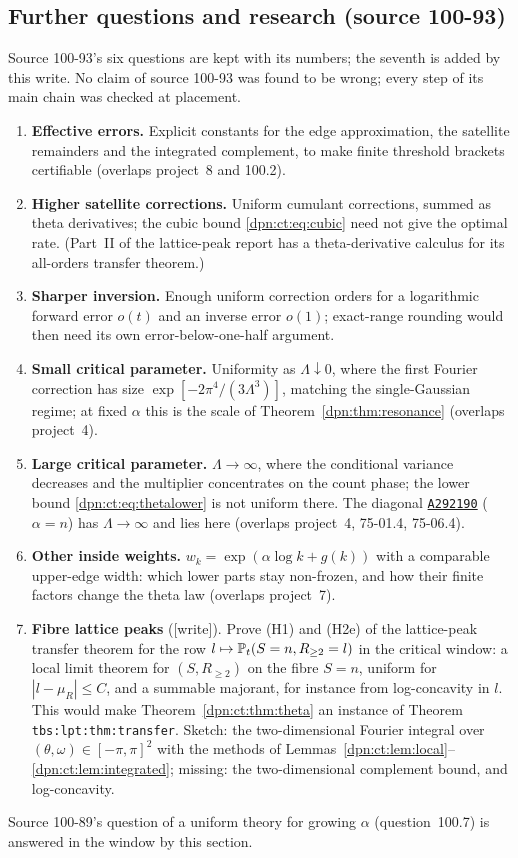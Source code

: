 \documentclass[11pt]{article}
\numberwithin{equation}{section}
\theoremstyle{definition}\newtheorem{definition}[theorem]{Definition}
\theoremstyle{remark}\newtheorem{remark}[theorem]{Remark}
\newcommand{\OEIS}[1]{\href{https://oeis.org/#1}{\texttt{#1}}}
\newcommand{\wrt}{\textup{[write]}}
\begin{document}
\subsection{Further questions and research (source 100-93)}\label{dpn:ct:sec:questions}
Source 100-93's six questions are kept with its numbers; the seventh is
added by this write.  No claim of source 100-93 was found to be wrong; every
step of its main chain was checked at placement.
\begin{enumerate}[label=\textbf{100-93.\arabic*}, leftmargin=*]
\item \textbf{Effective errors.}  Explicit constants for the edge
  approximation, the satellite remainders and the integrated complement, to
  make finite threshold brackets certifiable (overlaps project~8 and 100.2).
\item \textbf{Higher satellite corrections.}  Uniform cumulant corrections,
  summed as theta derivatives; the cubic bound \eqref{dpn:ct:eq:cubic} need not
  give the optimal rate.  (Part~II of the lattice-peak report has a
  theta-derivative calculus for its all-orders transfer theorem.)
\item \textbf{Sharper inversion.}  Enough uniform correction orders for a
  logarithmic forward error $o(t)$ and an inverse error $o(1)$; exact-range
  rounding would then need its own error-below-one-half argument.
\item \textbf{Small critical parameter.}  Uniformity as $\Lambda\downarrow0$,
  where the first Fourier correction has size $\exp[-2\pi^4/(3\Lambda^3)]$,
  matching the single-Gaussian regime; at fixed $\alpha$ this is the scale of
  Theorem~\ref{dpn:thm:resonance} (overlaps project~4).
\item \textbf{Large critical parameter.}  $\Lambda\to\infty$, where the
  conditional variance decreases and the multiplier concentrates on the count
  phase; the lower bound \eqref{dpn:ct:eq:thetalower} is not uniform there.  The
  diagonal \OEIS{A292190} ($\alpha=n$) has $\Lambda\to\infty$ and lies
  here (overlaps project~4, 75-01.4, 75-06.4).
\item \textbf{Other inside weights.}  $w_k=\exp(\alpha\log k+g(k))$ with a
  comparable upper-edge width: which lower parts stay non-frozen, and how their
  finite factors change the theta law (overlaps project~7).
\item \textbf{Fibre lattice peaks} (\wrt).  Prove (H1) and (H2e) of the
  lattice-peak transfer theorem for the row $l\mapsto\mathbb P_t(S=n,R_{\ge2}=l)$ in
  the critical window: a local limit theorem for $(S,R_{\ge2})$ on the fibre
  $S=n$, uniform for $|l-\mu_R|\le C$, and a summable majorant, for instance
  from log-concavity in $l$.  This would make Theorem~\ref{dpn:ct:thm:theta} an
  instance of Theorem \texttt{tbs:lpt:thm:transfer}.  Sketch: the
  two-dimensional Fourier integral over $(\theta,\omega)\in[-\pi,\pi]^2$ with the
  methods of Lemmas~\ref{dpn:ct:lem:local}--\ref{dpn:ct:lem:integrated};
  missing: the two-dimensional complement bound, and log-concavity.
\end{enumerate}
\noindent Source 100-89's question of a uniform theory for growing $\alpha$
(question~100.7) is answered in the window by this section.
\end{document}

